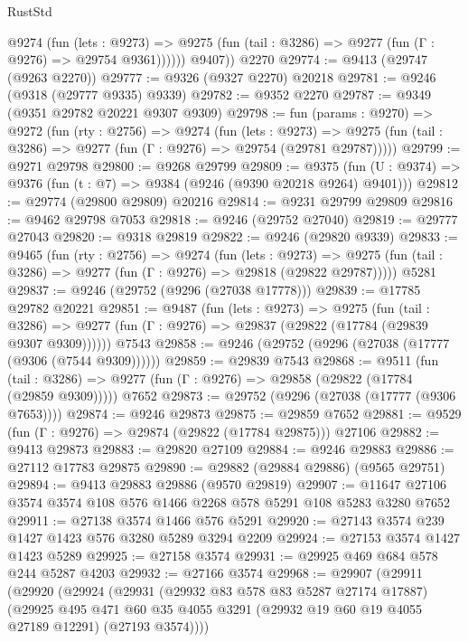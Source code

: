 \begin{lexlean}{RustStd}
\begin{coremodule}
            @9274
              (fun (lets : @9273) =>
              @9275 (fun (tail : @3286) => @9277 (fun (Γ : @9276) => @29754 @9361))))))
        @9407))
    @2270
@29774 := @9413 (@29747 (@9263 @2270))
@29777 := @9326 (@9327 @2270) @20218
@29781 := @9246 (@9318 (@29777 @9335) @9339)
@29782 := @9352 @2270
@29787 := @9349 (@9351 @29782 @20221 @9307 @9309)
@29798 := fun (params : @9270) =>
  @9272
    (fun (rty : @2756) =>
    @9274
      (fun (lets : @9273) =>
      @9275 (fun (tail : @3286) => @9277 (fun (Γ : @9276) => @29754 (@29781 @29787)))))
@29799 := @9271 @29798
@29800 := @9268 @29799
@29809 := @9375
    (fun (U : @9374) => @9376 (fun (t : @7) => @9384 (@9246 (@9390 @20218 @9264) @9401)))
@29812 := @29774 (@29800 @29809) @20216
@29814 := @9231 @29799 @29809
@29816 := @9462 @29798 @7053
@29818 := @9246 (@29752 @27040)
@29819 := @29777 @27043
@29820 := @9318 @29819
@29822 := @9246 (@29820 @9339)
@29833 := @9465
    (fun (rty : @2756) =>
    @9274
      (fun (lets : @9273) =>
      @9275 (fun (tail : @3286) => @9277 (fun (Γ : @9276) => @29818 (@29822 @29787)))))
    @5281
@29837 := @9246 (@29752 (@9296 (@27038 @17778)))
@29839 := @17785 @29782 @20221
@29851 := @9487
    (fun (lets : @9273) =>
    @9275
      (fun (tail : @3286) =>
      @9277 (fun (Γ : @9276) => @29837 (@29822 (@17784 (@29839 @9307 @9309))))))
    @7543
@29858 := @9246 (@29752 (@9296 (@27038 (@17777 (@9306 (@7544 @9309))))))
@29859 := @29839 @7543
@29868 := @9511
    (fun (tail : @3286) => @9277 (fun (Γ : @9276) => @29858 (@29822 (@17784 (@29859 @9309)))))
    @7652
@29873 := @29752 (@9296 (@27038 (@17777 (@9306 @7653))))
@29874 := @9246 @29873
@29875 := @29859 @7652
@29881 := @9529 (fun (Γ : @9276) => @29874 (@29822 (@17784 @29875))) @27106
@29882 := @9413 @29873
@29883 := @29820 @27109
@29884 := @9246 @29883
@29886 := @27112 @17783 @29875
@29890 := @29882 (@29884 @29886) (@9565 @29751)
@29894 := @9413 @29883 @29886 (@9570 @29819)
@29907 := @11647 @27106 @3574 @3574 @108 @576 @1466 @2268 @578 @5291 @108 @5283 @3280 @7652
@29911 := @27138 @3574 @1466 @576 @5291
@29920 := @27143 @3574 @239 @1427 @1423 @576 @3280 @5289 @3294 @2209
@29924 := @27153 @3574 @1427 @1423 @5289
@29925 := @27158 @3574
@29931 := @29925 @469 @684 @578 @244 @5287 @4203
@29932 := @27166 @3574
@29968 := @29907
    (@29911
      (@29920
        (@29924
          (@29931
            (@29932 @83 @578 @83 @5287 @27174 @17887)
            (@29925
              @495
              @471
              @60
              @35
              @4055
              @3291
              (@29932 @19 @60 @19 @4055 @27189 @12291)
              (@27193 @3574))))

\end{coremodule}
\end{lexlean}
